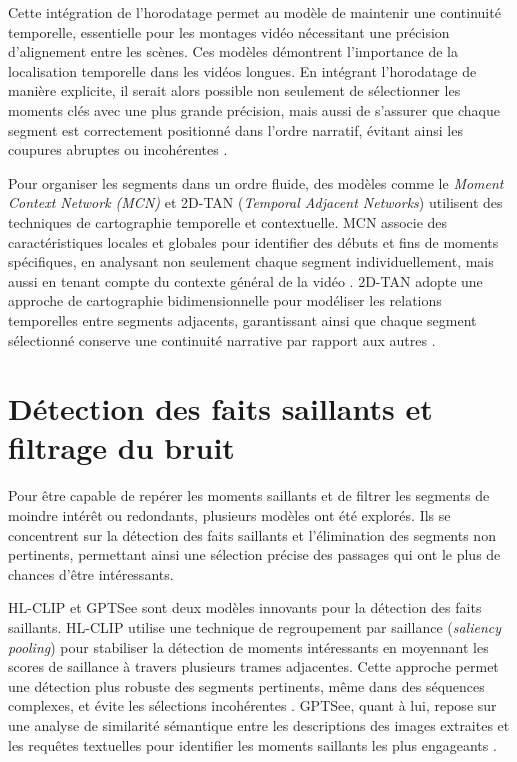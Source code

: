 Cette intégration de l’horodatage permet au modèle de maintenir une continuité temporelle, essentielle pour les montages vidéo nécessitant une précision d’alignement entre les scènes. Ces modèles démontrent l’importance de la localisation temporelle dans les vidéos longues. En intégrant l’horodatage de manière explicite, il serait alors possible non seulement de sélectionner les moments clés avec une plus grande précision, mais aussi de s’assurer que chaque segment est correctement positionné dans l’ordre narratif, évitant ainsi les coupures abruptes ou incohérentes \cite{lei2021_clipbert}\cite{anonymous2017_localizing}.

Pour organiser les segments dans un ordre fluide, des modèles comme le \textit{Moment Context Network (MCN)} \cite{anonymous2017_localizing} et 2D-TAN (\textit{Temporal Adjacent Networks}) \cite{zhang2020_temporal} utilisent des techniques de cartographie temporelle et contextuelle. MCN associe des caractéristiques locales et globales pour identifier des débuts et fins de moments spécifiques, en analysant non seulement chaque segment individuellement, mais aussi en tenant compte du contexte général de la vidéo \cite{zhang2016_lstm}\cite{zhang2019_memory}. 2D-TAN adopte une approche de cartographie bidimensionnelle pour modéliser les relations temporelles entre segments adjacents, garantissant ainsi que chaque segment sélectionné conserve une continuité narrative par rapport aux autres \cite{prabhu2017_retrieval}\cite{zhang2020_temporal}.

\section{Détection des faits saillants et filtrage du bruit}

Pour être capable de repérer les moments saillants et de filtrer les segments de moindre intérêt ou redondants, plusieurs modèles ont été explorés. Ils se concentrent sur la détection des faits saillants et l’élimination des segments non pertinents, permettant ainsi une sélection précise des passages qui ont le plus de chances d’être intéressants.

HL-CLIP \cite{han2024_clip} et GPTSee \cite{sun2023_gptsee} sont deux modèles innovants pour la détection des faits saillants. HL-CLIP utilise une technique de regroupement par saillance (\textit{saliency pooling}) pour stabiliser la détection de moments intéressants en moyennant les scores de saillance à travers plusieurs trames adjacentes. Cette approche permet une détection plus robuste des segments pertinents, même dans des séquences complexes, et évite les sélections incohérentes \cite{you2023_ferret}\cite{sun2023_gptsee}. GPTSee, quant à lui, repose sur une analyse de similarité sémantique entre les descriptions des images extraites et les requêtes textuelles pour identifier les moments saillants les plus engageants \cite{sun2023_gptsee}\cite{liu2022_umt}.

